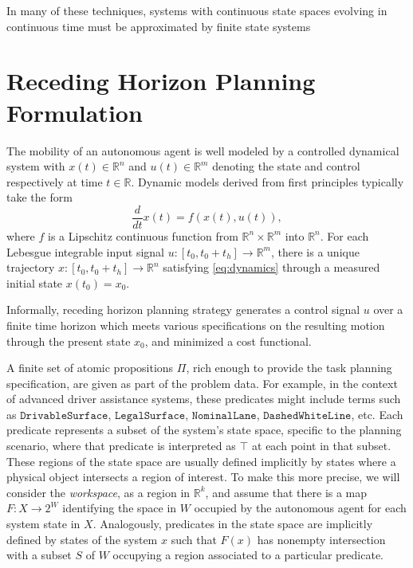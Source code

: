 \documentclass{llncs}
\begin{document}
In many of these techniques, systems with continuous state spaces evolving in continuous time must be approximated by finite state systems   

\section{\label{sec:background}Receding Horizon Planning Formulation}
The mobility of an autonomous agent is well modeled by a controlled dynamical system with $x(t)\in \mathbb{R}^n$ and $u(t)\in \mathbb{R}^m$ denoting the state and control respectively at time $t\in \mathbb{R}$.
%
Dynamic models derived from first principles typically take the form
\begin{equation}\label{eq:dynamics}
\frac{d}{dt}x(t)=f(x(t),u(t)),
\end{equation}
where $f$ is a Lipschitz continuous function from $\mathbb{R}^n\times \mathbb{R}^m$ into $\mathbb{R}^n$.
%
For each Lebesgue integrable input signal $u:[t_0,t_0+t_h]\rightarrow \mathbb{R}^m$, there is a unique trajectory $x:[t_0,t_0+t_h]\rightarrow \mathbb{R}^n$ satisfying \eqref{eq:dynamics} through a measured initial state $x(t_0)=x_0$.
%



Informally, receding horizon planning strategy generates a control signal $u$ over a finite time horizon which meets various specifications on the resulting motion through the present state $x_0$, and minimized a cost functional.



A finite set of atomic propositions $\Pi$, rich enough to provide the task planning specification, are given as part of the problem data. 
%
For example, in the context of advanced driver assistance systems, these predicates might include terms such as $\texttt{DrivableSurface}$, $\texttt{LegalSurface}$, $\texttt{NominalLane}$, $\texttt{DashedWhiteLine}$, etc.
%
Each predicate represents a subset of the system's state space, specific to the planning scenario, where that predicate is interpreted as $\top$ at each point in that subset.
These regions of the state space are usually defined implicitly by states where a physical object intersects a region of interest.
%
To make this more precise, we will consider the \emph{workspace}, as a region in $\mathbb{R}^k$, and assume that there is a map $F:X\rightarrow 2^W$ identifying the space in $W$ occupied by the autonomous agent for each system state in $X$.
%
Analogously, predicates in the state space are implicitly defined by states of the system $x$ such that $F(x)$ has nonempty intersection with a subset $S$ of $W$ occupying a region associated to a particular predicate.
\end{document}
